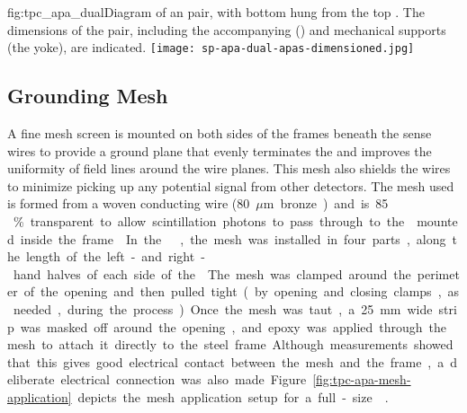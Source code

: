 
\begin{dunefigure}{fig:tpc_apa_dual}{Diagram of an  pair, with bottom  hung from the top . The dimensions of the  pair, including the accompanying  () and mechanical supports (the yoke), are indicated.}
\texttt{[image: sp-apa-dual-apas-dimensioned.jpg]} 
\end{dunefigure}


\subsection{Grounding Mesh}
\label{sec:fdsp-apa-mesh}

A fine mesh screen is mounted on both sides of the frames beneath the sense wires to provide a ground plane that evenly terminates the \efield and improves the uniformity of field lines around the wire planes.  This mesh also shields the wires to minimize picking up any potential signal from other detectors.  The mesh used is formed from a %
woven conducting wire (\SI{80}{$\mu$m} bronze) and is \num{85}\,\% transparent to allow scintillation photons to pass through to the  mounted inside the frame.


In the  , the mesh was installed in four parts, along the length of the left- and right-hand halves of each side of the . The mesh was clamped around the perimeter of the opening and then pulled tight (by opening and closing clamps, as needed, during the process).  Once the mesh was taut, a \SI{25}{mm} wide strip was masked off around the opening, and epoxy was applied through the mesh to attach it directly to the steel frame.  Although measurements showed that this gives good electrical contact between the mesh and the frame, a deliberate electrical connection was also made.  Figure~\ref{fig:tpc-apa-mesh-application} depicts the mesh application setup for a full-size  .

